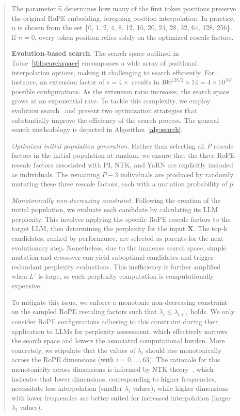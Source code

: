 \begin{abstract}
The parameter $\hat{n}$ determines how many of the first token positions preserve the original RoPE embedding, foregoing position interpolation. In practice, $\hat{n}$ is chosen from the set \{0, 1, 2, 4, 8, 12, 16, 20, 24, 28, 32, 64, 128, 256\}. If $\hat{n}=0$, every token position relies solely on the optimized rescale factors.

\textbf{Evolution-based search}. The search space outlined in Table~\ref{tbl:searchspace} encompasses a wide array of positional interpolation options, making it challenging to search efficiently. For instance, an extension factor of $s=4\times$ results in $400^{128/2}\times14 = 4\times10^{167}$ possible configurations. As the extension ratio increases, the search space grows at an exponential rate. To tackle this complexity, we employ evolution search~\cite{guo2020single} and present two optimization strategies that substantially improve the efficiency of the search process. The general search methodology is depicted in Algorithm~\ref{alg:search}.

\textit{Optimized initial population generation}. Rather than selecting all $P$ rescale factors in the initial population at random, we ensure that the three RoPE rescale factors associated with PI, NTK, and YaRN are explicitly included as individuals. The remaining $P-3$ individuals are produced by randomly mutating these three rescale factors, each with a mutation probability of $p$.

\textit{Monotonically non-decreasing constraint}. Following the creation of the initial population, we evaluate each candidate by calculating its LLM perplexity. This involves applying the specific RoPE rescale factors to the target LLM, then determining the perplexity for the input $\mathbf{X}$. The top-k candidates, ranked by performance, are selected as parents for the next evolutionary step. Nonetheless, due to the immense search space, simple mutation and crossover can yield suboptimal candidates and trigger redundant perplexity evaluations. This inefficiency is further amplified when $L'$ is large, as each perplexity computation is computationally expensive.

To mitigate this issue, we enforce a monotonic non-decreasing constraint on the sampled RoPE rescaling factors such that $\lambda_i \leq \lambda_{i+1}$ holds. We only consider RoPE configurations adhering to this constraint during their application to LLMs for perplexity assessment, which effectively narrows the search space and lowers the associated computational burden. More concretely, we stipulate that the values of $\lambda_i$ should rise monotonically across the RoPE dimensions (with $i=0,\ldots,63$). The rationale for this monotonicity across dimensions is informed by NTK theory~\cite{jacot2018neural,tancik2020fourier,ntk}, which indicates that lower dimensions, corresponding to higher frequencies, necessitate less interpolation (smaller $\lambda_i$ values), while higher dimensions with lower frequencies are better suited for increased interpolation (larger $\lambda_i$ values).


\end{abstract}
